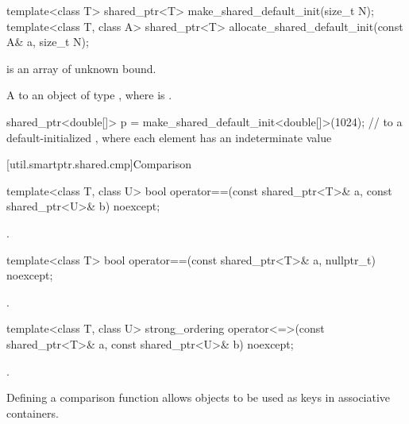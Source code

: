 %
%
\begin{itemdecl}
template<class T>
  shared_ptr<T> make_shared_default_init(size_t N);
template<class T, class A>
  shared_ptr<T> allocate_shared_default_init(const A& a, size_t N);
\end{itemdecl}

\begin{itemdescr}
\pnum
\constraints
{} is an array of unknown bound.

\pnum
\returns
A  to an object of type ,
where  is .

\pnum
\begin{example}
\begin{codeblock}
shared_ptr<double[]> p = make_shared_default_init<double[]>(1024);
  //  to a default-initialized , where each element has an indeterminate value
\end{codeblock}
\end{example}
\end{itemdescr}

[util.smartptr.shared.cmp]{Comparison}

%
\begin{itemdecl}
template<class T, class U>
  bool operator==(const shared_ptr<T>& a, const shared_ptr<U>& b) noexcept;
\end{itemdecl}

\begin{itemdescr}
\pnum
\returns
{}.
\end{itemdescr}

%
\begin{itemdecl}
template<class T>
  bool operator==(const shared_ptr<T>& a, nullptr_t) noexcept;
\end{itemdecl}

\begin{itemdescr}
\pnum
\returns
{}.
\end{itemdescr}

%
\begin{itemdecl}
template<class T, class U>
  strong_ordering operator<=>(const shared_ptr<T>& a, const shared_ptr<U>& b) noexcept;
\end{itemdecl}

\begin{itemdescr}
\pnum
\returns
{}.

\pnum
\begin{note}
Defining a comparison function allows  objects
to be used as keys in associative containers.
\end{note}
\end{itemdescr}

